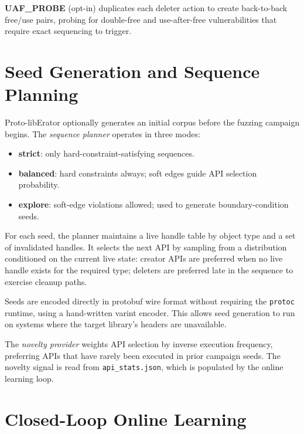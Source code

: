 \documentclass[sigconf,anonymous]{acmart}
\begin{document}
\textbf{UAF\_PROBE} (opt-in) duplicates each deleter action to create
back-to-back free/use pairs, probing for double-free and use-after-free
vulnerabilities that require exact sequencing to trigger.

\section{Seed Generation and Sequence Planning}
\label{sec:seeds}

Proto-libErator optionally generates an initial corpus before the fuzzing
campaign begins.  The \emph{sequence planner} operates in three modes:

\begin{itemize}
  \item \textbf{strict}: only hard-constraint-satisfying sequences.
  \item \textbf{balanced}: hard constraints always; soft edges guide API
    selection probability.
  \item \textbf{explore}: soft-edge violations allowed; used to generate
    boundary-condition seeds.
\end{itemize}

For each seed, the planner maintains a live handle table by object type
and a set of invalidated handles.  It selects the next API by sampling
from a distribution conditioned on the current live state: creator APIs
are preferred when no live handle exists for the required type; deleters
are preferred late in the sequence to exercise cleanup paths.

Seeds are encoded directly in protobuf wire format without requiring the
\texttt{protoc} runtime, using a hand-written varint encoder.  This
allows seed generation to run on systems where the target library's
headers are unavailable.

The \emph{novelty provider} weights API selection by inverse execution
frequency, preferring APIs that have rarely been executed in prior campaign
seeds.  The novelty signal is read from \texttt{api\_stats.json}, which is
populated by the online learning loop.

\section{Closed-Loop Online Learning}
\label{sec:online}
\end{document}
